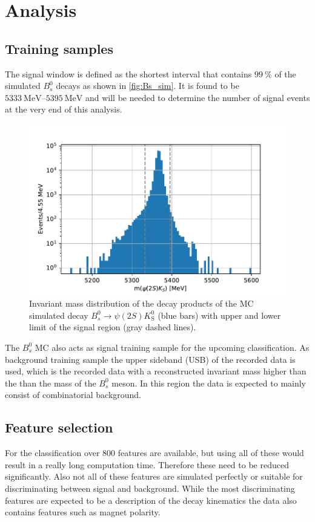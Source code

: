 \section{Analysis}\label{sec:analysis}

\subsection{Training samples}
The signal window is defined as the shortest interval that contains $\SI{99}{\percent}$ of the simulated $B^0_s$ decays as shown in \autoref{fig:Bs_sim}.
It is found to be $\SIrange{5333}{5395}{\mega\eV}$ and will be needed to determine the number of signal events at the very end of this analysis.

\begin{figure}[H]
  \centering
  \includegraphics[width=12cm]{plots/sim_hist_limits.pdf}
  \caption{Invariant mass distribution of the decay products of the MC simulated decay $B^0_s \to \psi(2S)K^0_\mathrm{S}$ (blue bars) with upper and lower limit of the signal region (gray dashed lines).}
  \label{fig:Bs_sim}
\end{figure}

The $B^0_s$ MC also acts as signal training sample for the upcoming classification. As background training sample the upper sideband (USB) of the recorded data is used, which is the recorded data with a reconstructed invariant mass higher than the than the mass of the $B^0_s$ meson. In this region the data is expected to mainly consist of combinatorial background.

\subsection{Feature selection}
For the classification over $\num{800}$ features are available, but using all of these would result in a really long computation time. Therefore these need to be reduced significantly.
Also not all of these features are simulated perfectly or suitable for discriminating between signal and background.
While the most discriminating features are expected to be a description of the decay kinematics the data also contains features such as magnet polarity.

